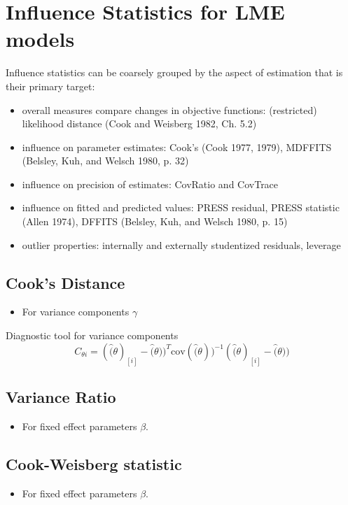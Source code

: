 \documentclass[12pt, a4paper]{report}
\theoremstyle{plain}
\theoremstyle{definition}
\theoremstyle{remark}
\begin{document}
	\section{Influence Statistics for LME models} %
	Influence statistics can be coarsely grouped by the aspect of estimation that is their primary target:
	\begin{itemize}
		\item overall measures compare changes in objective functions: (restricted) likelihood distance (Cook and Weisberg 1982, Ch. 5.2)
		\item influence on parameter estimates: Cook's  (Cook 1977, 1979), MDFFITS (Belsley, Kuh, and Welsch 1980, p. 32)
		\item influence on precision of estimates: CovRatio and CovTrace
		\item influence on fitted and predicted values: PRESS residual, PRESS statistic (Allen 1974), DFFITS (Belsley, Kuh, and Welsch 1980, p. 15)
		\item outlier properties: internally and externally studentized residuals, leverage
	\end{itemize}
	
	
	
	\subsection{Cook's Distance} %
	\begin{itemize}
		\item For variance components $\gamma$
	\end{itemize}
	
	Diagnostic tool for variance components
	\[ C_{\theta i} =(\hat(\theta)_{[i]} - \hat(\theta))^{T}\mbox{cov}( \hat(\theta))^{-1}(\hat(\theta)_{[i]} - \hat(\theta))\]
	
	\subsection{Variance Ratio} %
	\begin{itemize}
		\item For fixed effect parameters $\beta$.
	\end{itemize}
	
	
	\subsection{Cook-Weisberg statistic} %
	\begin{itemize}
		\item For fixed effect parameters $\beta$.
	\end{itemize}
\end{document}
